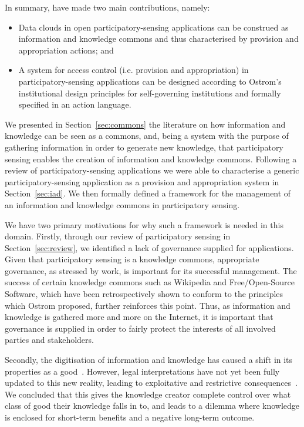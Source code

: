 In summary, have made two main contributions, namely:
\begin{itemize}
\item Data clouds in open participatory-sensing applications can be construed as information and knowledge commons and thus characterised by provision and appropriation actions; and
\item A system for access control (i.e. provision and appropriation) in participatory-sensing applications can be designed according to Ostrom's institutional design principles for self-governing institutions and formally specified in an action language.
\end{itemize}
We presented in Section~\ref{sec:commons} the literature on how information and knowledge can be seen as a commons, and, being a system with the purpose of gathering information in order to generate new knowledge, that participatory sensing enables the creation of information and knowledge commons. Following a review of participatory-sensing applications we were able to characterise a generic participatory-sensing application as a provision and appropriation system in Section~\ref{sec:iad}. We then formally defined a framework for the management of an information and knowledge commons in participatory sensing.

We have two primary motivations for why such a framework is needed in this domain. 
Firstly, through our review of participatory sensing in Section~\ref{sec:review}, we identified a lack of governance supplied for applications. Given that participatory sensing is a knowledge commons, appropriate governance, as stressed by  work, is important for its successful management. The success of certain knowledge commons such as Wikipedia and Free/Open-Source Software, which have been retrospectively shown to conform to the principles which Ostrom proposed, further reinforces this point. Thus, as information and knowledge is gathered more and more on the Internet, it is important that governance is supplied in order to fairly protect the interests of all involved parties and stakeholders.

Secondly, the digitisation of information and knowledge has caused a shift in its properties as a good~\citep{Ostrom2003}. However, legal interpretations have not yet been fully updated to this new reality, leading to exploitative and restrictive consequences~\citep{Lessig2004}. We concluded that this gives the knowledge creator complete control over what class of good their knowledge falls in to, and leads to a dilemma where knowledge is enclosed for short-term benefits and a negative long-term outcome.

